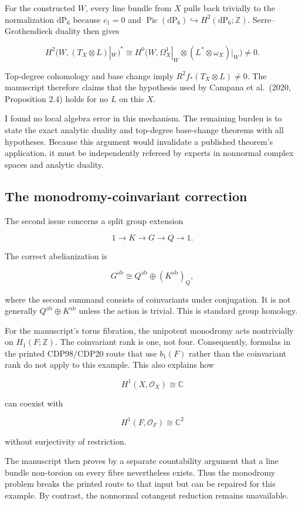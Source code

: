 \documentclass[
  10pt,
  letterpaper,
]{article}
\newcommand{\Z}{\mathbb Z}
\newcommand{\C}{\mathbb C}
\newcommand{\cO}{\mathcal O}
\newcommand{\Pic}{\operatorname{Pic}}
\newcommand{\dP}{\mathrm{dP}}
\begin{document}
For the constructed \(W\), every line bundle from \(X\) pulls back
trivially to the normalization \(\dP_6\) because \(c_1=0\) and
\(\Pic(\dP_6)\hookrightarrow H^2(\dP_6;\Z)\). Serre--Grothendieck
duality then gives

\[
H^2\bigl(W,(T_X\otimes L)|_W\bigr)^*
\cong
H^0\bigl(W,\Omega_X^1|_W\otimes(L^*\otimes\omega_X)|_W\bigr)
\ne0.
\]

Top-degree cohomology and base change imply
\(R^2f_*(T_X\otimes L)\ne0\). The manuscript therefore claims that the
hypothesis used by Campana et al.~(2020, Proposition 2.4) holds for no
\(L\) on this \(X\).

I found no local algebra error in this mechanism. The remaining burden
is to state the exact analytic duality and top-degree base-change
theorems with all hypotheses. Because this argument would invalidate a
published theorem's application, it must be independently refereed by
experts in nonnormal complex spaces and analytic duality.

\subsection{The monodromy-coinvariant
correction}\label{the-monodromy-coinvariant-correction}

The second issue concerns a split group extension

\[
1\to K\to G\to Q\to1.
\]

The correct abelianization is

\[
G^{\mathrm{ab}}\cong Q^{\mathrm{ab}}\oplus(K^{\mathrm{ab}})_Q,
\]

where the second summand consists of coinvariants under conjugation. It
is not generally \(Q^{\mathrm{ab}}\oplus K^{\mathrm{ab}}\) unless the
action is trivial. This is standard group homology.

For the manuscript's torus fibration, the unipotent monodromy acts
nontrivially on \(H_1(F;\Z)\). The coinvariant rank is one, not four.
Consequently, formulas in the printed CDP98/CDP20 route that use
\(b_1(F)\) rather than the coinvariant rank do not apply to this
example. This also explains how

\[
H^1(X,\cO_X)\cong\C
\]

can coexist with

\[
H^1(F,\cO_F)\cong\C^2
\]

without surjectivity of restriction.

The manuscript then proves by a separate countability argument that a
line bundle non-torsion on every fibre nevertheless exists. Thus the
monodromy problem breaks the printed route to that input but can be
repaired for this example. By contrast, the nonnormal cotangent
reduction remains unavailable.
\end{document}
